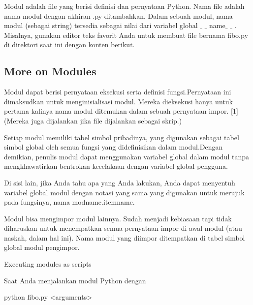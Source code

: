 \vspace{\baselineskip}
\noindent Modul adalah file yang berisi definisi dan pernyataan Python. Nama file adalah nama modul dengan akhiran .py ditambahkan. Dalam sebuah modul, nama modul (sebagai string) tersedia sebagai nilai dari variabel global $ \_ $ $ \_ $ name$ \_ $ $ \_ $ . Misalnya, gunakan editor teks favorit Anda untuk membuat file bernama fibo.py di direktori saat ini dengan konten berikut.\par
\vspace{\baselineskip}
\subsection {More on Modules}

\noindent Modul dapat berisi pernyataan eksekusi serta definisi fungsi.Pernyataan ini dimaksudkan untuk menginisialisasi modul. Mereka dieksekusi hanya untuk pertama kalinya nama modul ditemukan dalam sebuah pernyataan impor. [1] (Mereka juga dijalankan jika file dijalankan sebagai skrip.)\par

\vspace{\baselineskip}
\noindent Setiap modul memiliki tabel simbol pribadinya, yang digunakan sebagai tabel simbol global oleh semua fungsi yang didefinisikan dalam modul.Dengan demikian, penulis modul dapat menggunakan variabel global dalam modul tanpa mengkhawatirkan bentrokan kecelakaan dengan variabel global pengguna.\par

\vspace{\baselineskip}
\noindent Di sisi lain, jika Anda tahu apa yang Anda lakukan, Anda dapat menyentuh variabel global modul dengan notasi yang sama yang digunakan untuk merujuk pada fungsinya, nama modname.itemname.\par

\vspace{\baselineskip}
\noindent Modul bisa mengimpor modul lainnya. Sudah menjadi kebiasaan tapi tidak diharuskan untuk menempatkan semua pernyataan impor di awal modul (atau naskah, dalam hal ini). Nama modul yang diimpor ditempatkan di tabel simbol global modul pengimpor.\par


\vspace{\baselineskip}
\noindent Executing modules as scripts\par
\vspace{\baselineskip}
\noindent Saat Anda menjalankan modul Python dengan\par
\vspace{\baselineskip}
\noindent python fibo.py <arguments>\par

